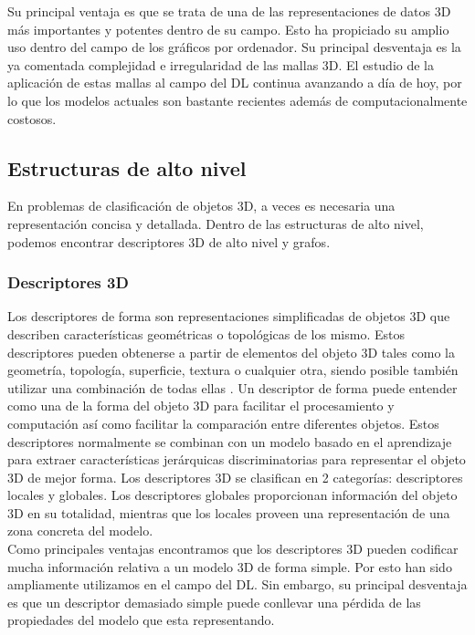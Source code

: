 Su principal ventaja es que se trata de una de las representaciones de datos 3D más importantes y potentes dentro de su campo. Esto ha propiciado su amplio uso dentro del campo de los gráficos por ordenador. Su principal desventaja es la ya comentada complejidad e irregularidad de las mallas 3D. El estudio de la aplicación de estas mallas al campo del DL continua avanzando a día de hoy, por lo que los modelos actuales son bastante recientes además de computacionalmente costosos.

\subsection{Estructuras de alto nivel}
En problemas de clasificación de objetos 3D, a veces es necesaria una representación concisa y detallada. Dentro de las estructuras de alto nivel, podemos encontrar descriptores 3D de alto nivel y grafos.

\subsubsection{Descriptores 3D}
Los descriptores de forma son representaciones simplificadas de objetos 3D que describen características geométricas o topológicas de los mismo. Estos descriptores pueden obtenerse a partir de elementos del objeto 3D tales como la geometría, topología, superficie, textura o cualquier otra, siendo posible también utilizar una combinación de todas ellas \cite{zhang2007survey,kazmi2013survey}. Un descriptor de forma puede entender como una  de la forma del objeto 3D para facilitar el procesamiento y computación así como facilitar la comparación entre diferentes objetos. 
Estos descriptores normalmente se combinan con un modelo basado en el aprendizaje para extraer características jerárquicas discriminatorias para representar el objeto 3D de mejor forma.
Los descriptores 3D se clasifican en 2 categorías: descriptores locales y globales. Los descriptores globales proporcionan información del objeto 3D en su totalidad, mientras que los locales proveen una representación de una zona concreta del modelo.
\\

Como principales ventajas encontramos que los descriptores 3D pueden codificar mucha información relativa a un modelo 3D de forma simple. Por esto han sido ampliamente utilizamos en el campo del DL. Sin embargo, su principal desventaja es que un descriptor demasiado simple puede conllevar una pérdida de las propiedades del modelo que esta representando.
\\

